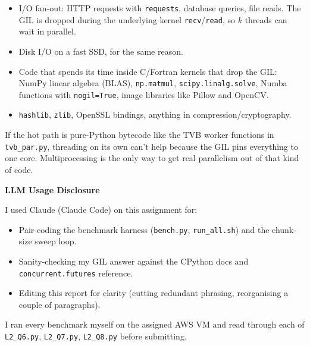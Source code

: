 \documentclass[11pt,a4paper]{article}
\begin{document}
\begin{itemize}
    \item I/O fan-out: HTTP requests with \texttt{requests}, database
    queries, file reads. The GIL is dropped during the underlying
    kernel \texttt{recv}/\texttt{read}, so $k$ threads can wait in
    parallel.
    \item Disk I/O on a fast SSD, for the same reason.
    \item Code that spends its time inside C/Fortran kernels that
    drop the GIL: NumPy linear algebra (BLAS), \texttt{np.matmul},
    \texttt{scipy.linalg.solve}, Numba functions with
    \texttt{nogil=True}, image libraries like Pillow and OpenCV.
    \item \texttt{hashlib}, \texttt{zlib}, OpenSSL bindings, anything
    in compression/cryptography.
\end{itemize}

If the hot path is pure-Python bytecode like the TVB worker functions
in \texttt{tvb\_par.py}, threading on its own can't help because the
GIL pins everything to one core. Multiprocessing is the only way to
get real parallelism out of that kind of code.

\vspace{1.5em}

{\color{headingcolor}\sffamily\large\bfseries LLM Usage Disclosure}

\vspace{0.3em}

I used Claude (Claude Code) on this assignment for:
\begin{itemize}
    \item Pair-coding the benchmark harness (\texttt{bench.py},
    \texttt{run\_all.sh}) and the chunk-size sweep loop.
    \item Sanity-checking my GIL answer against the CPython docs and
    \texttt{concurrent.futures} reference.
    \item Editing this report for clarity (cutting redundant phrasing,
    reorganising a couple of paragraphs).
\end{itemize}

I ran every benchmark myself on the assigned AWS VM and read through
each of \texttt{L2\_Q6.py}, \texttt{L2\_Q7.py}, \texttt{L2\_Q8.py}
before submitting.
\end{document}
